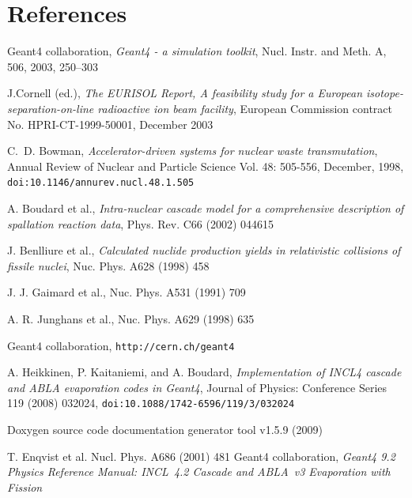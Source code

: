 \documentclass[a4paper]{jpconf}
\begin{document}


\section*{References}


\begin{thebibliography}{9}
 Geant4 collaboration, 
\emph{Geant4 - a simulation toolkit}, Nucl. Instr. and Meth. A, 506, 2003, 250--303

J.Cornell (ed.), \emph{The EURISOL Report, A feasibility study for a
European isotope-separation-on-line radioactive ion beam facility},
European Commission contract No. HPRI-CT-1999-50001, December 2003

C.~D. Bowman, \emph{Accelerator-driven systems for nuclear waste transmutation},
Annual Review of Nuclear and Particle Science Vol. 48: 505-556, December, 1998,
{\tt doi:10.1146/annurev.nucl.48.1.505}

 A. Boudard et al., \emph{Intra-nuclear cascade model for
    a comprehensive description of spallation reaction data}, Phys.
  Rev. C66 (2002) 044615

 J. Benlliure et al., \emph{Calculated nuclide
    production yields in relativistic collisions of fissile nuclei},
  Nuc. Phys. A628 (1998) 458

 J. J. Gaimard et al., %
  Nuc. Phys. A531 (1991) 709

 A. R. Junghans et al., %
  Nuc. Phys. A629 (1998) 635

 Geant4 collaboration, {\tt http://\-cern.ch/\-geant4}

A. Heikkinen, P. Kaitaniemi, and A. Boudard,
{\em Implementation of INCL4 cascade and ABLA evaporation codes in Geant4},
Journal of Physics: Conference Series 119 (2008) 032024, {\tt doi:10.1088/1742-6596/119/3/032024}

 Doxygen source code documentation generator tool v1.5.9 (2009)

 T. Enqvist et al. %
  Nucl. Phys. A686 (2001) 481
 Geant4 collaboration, \emph{Geant4 9.2 Physics Reference Manual: INCL~4.2 Cascade and ABLA~v3 Evaporation with Fission} 


\end{thebibliography}
\end{document}
